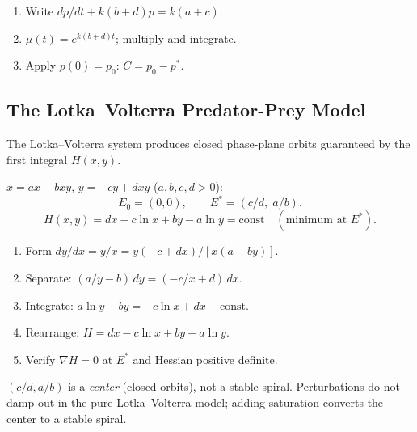 \begin{methodbox}
\begin{enumerate}[leftmargin=1.6em, itemsep=3pt]
  \item Write $dp/dt + k(b+d)p = k(a+c)$.
  \item $\mu(t) = e^{k(b+d)t}$; multiply and integrate.
  \item Apply $p(0) = p_0$: $C = p_0 - p^*$.
\end{enumerate}
\end{methodbox}

\subsection{The Lotka--Volterra Predator-Prey Model}

The Lotka--Volterra system produces closed phase-plane orbits guaranteed by
the first integral $H(x,y)$.

\begin{formulabox}
$\dot{x} = ax - bxy$, $\dot{y} = -cy + dxy$ ($a,b,c,d > 0$):
\[
  E_0 = (0,0), \qquad E^* = (c/d,\; a/b).
\]
\[
  H(x,y) = dx - c\ln x + by - a\ln y = \text{const} \quad
  (\text{minimum at } E^*).
\]
\end{formulabox}

\begin{methodbox}
\begin{enumerate}[leftmargin=1.6em, itemsep=3pt]
  \item Form $dy/dx = \dot{y}/\dot{x} = y(-c + dx)/[x(a - by)]$.
  \item Separate: $(a/y - b)\,dy = (-c/x + d)\,dx$.
  \item Integrate: $a\ln y - by = -c\ln x + dx + \text{const}$.
  \item Rearrange: $H = dx - c\ln x + by - a\ln y$.
  \item Verify $\nabla H = 0$ at $E^*$ and Hessian positive definite.
\end{enumerate}
\end{methodbox}

\begin{warningbox}
$(c/d, a/b)$ is a \emph{center} (closed orbits), not a stable spiral.
Perturbations do not damp out in the pure Lotka--Volterra model; adding
saturation converts the center to a stable spiral.
\end{warningbox}

